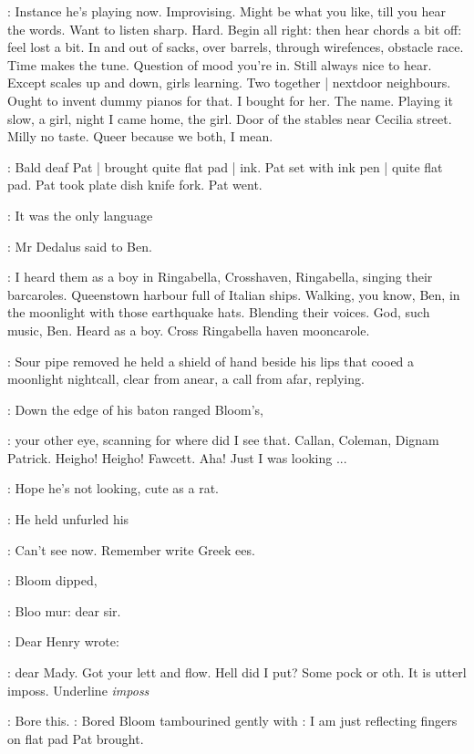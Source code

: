 \BloomInt:
Instance he's playing now.
Improvising.
Might be what you like,
till you hear the words.
Want to listen sharp.
Hard.
Begin all right:
then hear chords a bit off:
feel lost a bit.
In and out of sacks,
over barrels,
through wirefences,
obstacle race.
Time makes the tune.
Question of mood you're in.
Still always nice to hear.
Except scales up and down,
girls learning.
Two together |
nextdoor neighbours.
Ought to invent dummy pianos for that.
I bought for her.
The name.
Playing it slow,
a girl,
night I came home,
the girl.
Door of the stables near Cecilia street.
Milly no taste.
Queer because we both,
I mean.

:
Bald deaf Pat |
brought quite flat pad |
ink.
Pat set with ink pen |
quite flat pad.
Pat took plate dish knife fork.
Pat went.

\simon:
It was the only language

:
Mr Dedalus said to Ben.

\simon:
I heard them as a boy in Ringabella,
Crosshaven,
Ringabella,
singing their barcaroles.
Queenstown harbour full of Italian ships.
Walking,
you know,
Ben,
in the moonlight with those earthquake hats.
Blending their voices.
God,
such music,
Ben.
Heard as a boy.
Cross Ringabella haven mooncarole.

:
Sour pipe removed he held a shield of hand beside his lips that cooed
a moonlight nightcall,
clear from anear,
a call from afar,
replying.

:
Down the edge of his  baton ranged Bloom's,

\BloomInt:
your other eye,
scanning for where did I see that.
Callan,
Coleman,
Dignam Patrick.
Heigho!
Heigho!
Fawcett.
Aha!
Just I was looking ...

\BloomInt:
Hope he's not looking,
cute as a rat.

:
He held unfurled his 

\BloomInt:
Can't see now.
Remember write Greek ees.

:
Bloom dipped,

\BloomInt:
Bloo mur:
dear sir.

:
Dear Henry wrote:

\BloomInt:
dear Mady.
Got your lett and flow.
Hell did I put?
Some pock or oth.
It is utterl imposs.
Underline \emph{imposs}

\BloomInt:
Bore this.
:
Bored Bloom tambourined gently with
\BloomInt:
I am just reflecting
fingers on flat pad Pat brought.

